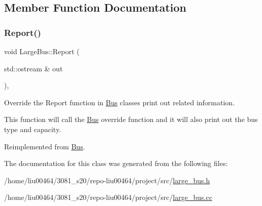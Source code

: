 \subsection{Member Function Documentation}
\mbox{\label{classLargeBus_a4e20f9c3199c1099f653f755b618ccea}} 
\subsubsection{\texorpdfstring{Report()}{Report()}}
{\footnotesize\ttfamily void Large\+Bus\+::\+Report (\begin{DoxyParamCaption}\item[{std\+::ostream \&}]{out }\end{DoxyParamCaption})\hspace{0.3cm}{\ttfamily [override]}, {\ttfamily [virtual]}}



Override the Report function in \hyperlink{classBus}{Bus} classes print out related information. 

This function will call the \hyperlink{classBus}{Bus} override function and it will also print out the bus type and capacity. 

Reimplemented from \hyperlink{classBus}{Bus}.



The documentation for this class was generated from the following files\+:\begin{DoxyCompactItemize}
\item 
/home/liu00464/3081\+\_\+s20/repo-\/liu00464/project/src/\hyperlink{large__bus_8h}{large\+\_\+bus.\+h}\item 
/home/liu00464/3081\+\_\+s20/repo-\/liu00464/project/src/\hyperlink{large__bus_8cc}{large\+\_\+bus.\+cc}\end{DoxyCompactItemize}
